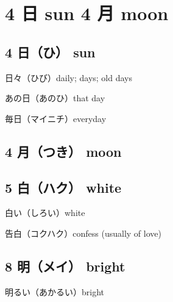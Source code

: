 \chapter{4 日 sun 4 月 moon}

\section{4 日（ひ） sun}

日々（ひび）daily; days; old days

あの日（あのひ）that day

毎日（マイニチ）everyday

\section{4 月（つき） moon}

\section{5 白（ハク） white}

白い（しろい）white

告白（コクハク）confess (usually of love)

\section{8 明（メイ） bright}

明るい（あかるい）bright
